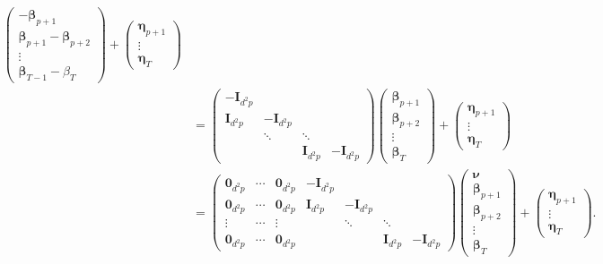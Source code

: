 \documentclass[fleqn]{article}
\begin{document}
\begin{align*}
\begin{pmatrix}
        - \bm \beta_{p+1} \\
        \bm \beta_{p+1} - \bm \beta_{p+2} \\
        \vdots \\
        \bm \beta_{T-1} - \beta_{T}
    \end{pmatrix}
    +
    \begin{pmatrix}
        \bm \eta_{p+1} \\
        \vdots \\
        \bm \eta_T
    \end{pmatrix} \\
    &= \begin{pmatrix}
        - \bm I_{d^2p} &                &              &                \\
          \bm I_{d^2p} & - \bm I_{d^2p} &              &                \\
                       & \ddots         & \ddots       &                \\
                       &                & \bm I_{d^2p} & - \bm I_{d^2p}
    \end{pmatrix}
    \begin{pmatrix}
        \bm \beta_{p+1} \\
        \bm \beta_{p+2} \\
        \vdots \\
        \bm \beta_T
    \end{pmatrix}
    +
    \begin{pmatrix}
        \bm \eta_{p+1} \\
        \vdots \\
        \bm \eta_T
    \end{pmatrix} \\
    &= \begin{pmatrix}
        \bm 0_{d^2p} & \cdots & \bm 0_{d^2p} & - \bm I_{d^2p} &                &              &                \\
        \bm 0_{d^2p} & \cdots & \bm 0_{d^2p} &   \bm I_{d^2p} & - \bm I_{d^2p} &              &                \\
        \vdots       & \cdots & \vdots       &                & \ddots         & \ddots       &                \\
        \bm 0_{d^2p} & \cdots & \bm 0_{d^2p} &                &                & \bm I_{d^2p} & - \bm I_{d^2p}
    \end{pmatrix}
    \begin{pmatrix}
        \bm \nu \\
        \bm \beta_{p+1} \\
        \bm \beta_{p+2} \\
        \vdots \\
        \bm \beta_T
    \end{pmatrix}
    +
    \begin{pmatrix}
        \bm \eta_{p+1} \\
        \vdots \\
        \bm \eta_T
    \end{pmatrix}.
\end{align*}
\end{document}
